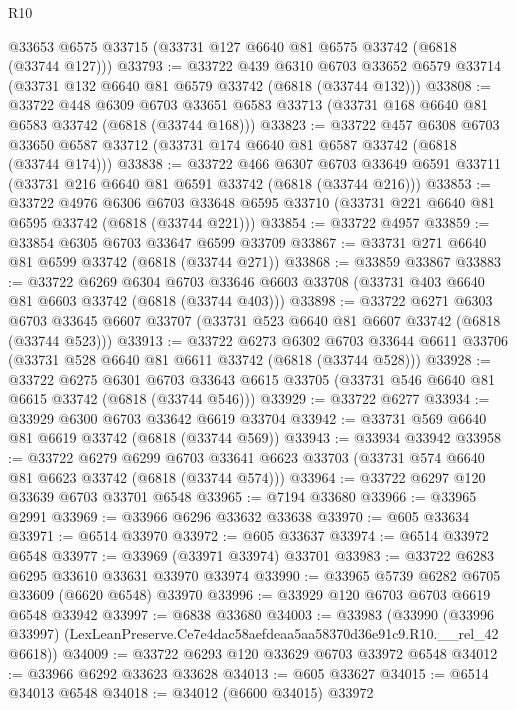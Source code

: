 \begin{lexlean}{R10}
\begin{coremodule}
    @33653
    @6575
    @33715
    (@33731 @127 @6640 @81 @6575 @33742 (@6818 (@33744 @127)))
@33793 := @33722
    @439
    @6310
    @6703
    @33652
    @6579
    @33714
    (@33731 @132 @6640 @81 @6579 @33742 (@6818 (@33744 @132)))
@33808 := @33722
    @448
    @6309
    @6703
    @33651
    @6583
    @33713
    (@33731 @168 @6640 @81 @6583 @33742 (@6818 (@33744 @168)))
@33823 := @33722
    @457
    @6308
    @6703
    @33650
    @6587
    @33712
    (@33731 @174 @6640 @81 @6587 @33742 (@6818 (@33744 @174)))
@33838 := @33722
    @466
    @6307
    @6703
    @33649
    @6591
    @33711
    (@33731 @216 @6640 @81 @6591 @33742 (@6818 (@33744 @216)))
@33853 := @33722
    @4976
    @6306
    @6703
    @33648
    @6595
    @33710
    (@33731 @221 @6640 @81 @6595 @33742 (@6818 (@33744 @221)))
@33854 := @33722 @4957
@33859 := @33854 @6305 @6703 @33647 @6599 @33709
@33867 := @33731 @271 @6640 @81 @6599 @33742 (@6818 (@33744 @271))
@33868 := @33859 @33867
@33883 := @33722
    @6269
    @6304
    @6703
    @33646
    @6603
    @33708
    (@33731 @403 @6640 @81 @6603 @33742 (@6818 (@33744 @403)))
@33898 := @33722
    @6271
    @6303
    @6703
    @33645
    @6607
    @33707
    (@33731 @523 @6640 @81 @6607 @33742 (@6818 (@33744 @523)))
@33913 := @33722
    @6273
    @6302
    @6703
    @33644
    @6611
    @33706
    (@33731 @528 @6640 @81 @6611 @33742 (@6818 (@33744 @528)))
@33928 := @33722
    @6275
    @6301
    @6703
    @33643
    @6615
    @33705
    (@33731 @546 @6640 @81 @6615 @33742 (@6818 (@33744 @546)))
@33929 := @33722 @6277
@33934 := @33929 @6300 @6703 @33642 @6619 @33704
@33942 := @33731 @569 @6640 @81 @6619 @33742 (@6818 (@33744 @569))
@33943 := @33934 @33942
@33958 := @33722
    @6279
    @6299
    @6703
    @33641
    @6623
    @33703
    (@33731 @574 @6640 @81 @6623 @33742 (@6818 (@33744 @574)))
@33964 := @33722 @6297 @120 @33639 @6703 @33701 @6548
@33965 := @7194 @33680
@33966 := @33965 @2991
@33969 := @33966 @6296 @33632 @33638
@33970 := @605 @33634
@33971 := @6514 @33970
@33972 := @605 @33637
@33974 := @6514 @33972 @6548
@33977 := @33969 (@33971 @33974) @33701
@33983 := @33722 @6283 @6295 @33610 @33631 @33970 @33974
@33990 := @33965 @5739 @6282 @6705 @33609 (@6620 @6548) @33970
@33996 := @33929 @120 @6703 @6703 @6619 @6548 @33942
@33997 := @6838 @33680
@34003 := @33983
    (@33990 (@33996 @33997) (LexLeanPreserve.Ce7e4dac58aefdeaa5aa58370d36e91c9.R10.__rel_42 @6618))
@34009 := @33722 @6293 @120 @33629 @6703 @33972 @6548
@34012 := @33966 @6292 @33623 @33628
@34013 := @605 @33627
@34015 := @6514 @34013 @6548
@34018 := @34012 (@6600 @34015) @33972

\end{coremodule}
\end{lexlean}
